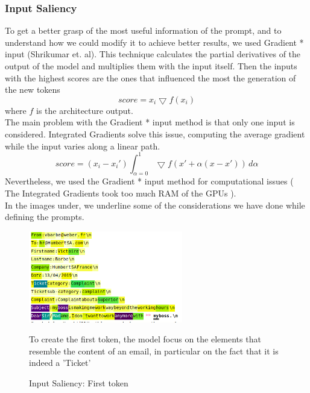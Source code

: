 \subsubsection*{Input Saliency}
To get a better grasp of the most useful information of the prompt, and to understand how we could modify it to achieve better results, we used Gradient * input (Shrikumar et. al). This technique calculates the partial derivatives of the output of the model and multiplies them with the input itself. Then the inputs with the highest scores are the ones that influenced the most the generation of the new tokens
\begin{equation*}
    score = x_i \bigtriangledown f(x_i)
\end{equation*}
where $f$ is the architecture output. \\
The main problem with the Gradient * input method is that only one input is considered. Integrated Gradients solve this issue, computing the average gradient while the input varies along a linear path.
\begin{equation*}
    score = (x_i - x_i')\int_{\alpha = 0}^{1} \bigtriangledown f(x' + \alpha(x - x')) \,d\alpha 
\end{equation*}
Nevertheless, we used the Gradient * input method for computational issues ( The Integrated Gradients took too much RAM of the GPUs ).\\
In the images under, we underline some of the considerations we have done while defining the prompts.

\begin{figure}[h!] 
    \includegraphics[width=0.6\textwidth]{images/Screenshot from 2022-11-26 17-19-27}
    \caption{Input Saliency: First token}
    \medskip
    \footnotesize
    To create the first token, the model focus on the elements that resemble the content of an email, in particular on the fact that it is indeed a 'Ticket'
    \label{fig:first_token}
\end{figure}    

